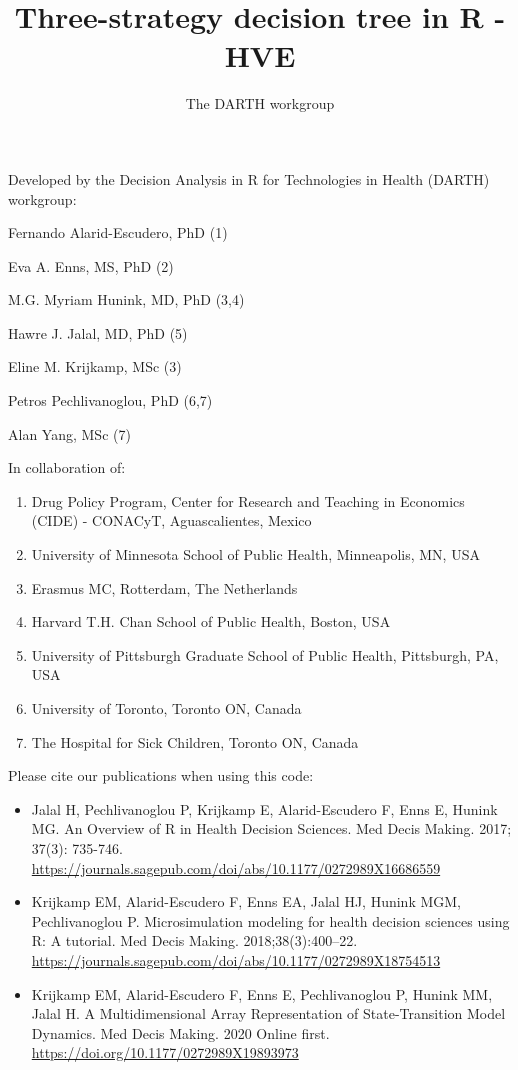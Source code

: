 \documentclass[
]{article}
\title{Three-strategy decision tree in R - HVE}
\author{The DARTH workgroup}
\date{}
\providecommand{\tightlist}{%
  \setlength{\itemsep}{0pt}\setlength{\parskip}{0pt}}
\begin{document}
\maketitle

Developed by the Decision Analysis in R for Technologies in Health
(DARTH) workgroup:

Fernando Alarid-Escudero, PhD (1)

Eva A. Enns, MS, PhD (2)

M.G. Myriam Hunink, MD, PhD (3,4)

Hawre J. Jalal, MD, PhD (5)

Eline M. Krijkamp, MSc (3)

Petros Pechlivanoglou, PhD (6,7)

Alan Yang, MSc (7)

In collaboration of:

\begin{enumerate}
\def\labelenumi{\arabic{enumi}.}
\tightlist
\item
  Drug Policy Program, Center for Research and Teaching in Economics
  (CIDE) - CONACyT, Aguascalientes, Mexico
\item
  University of Minnesota School of Public Health, Minneapolis, MN, USA
\item
  Erasmus MC, Rotterdam, The Netherlands
\item
  Harvard T.H. Chan School of Public Health, Boston, USA
\item
  University of Pittsburgh Graduate School of Public Health, Pittsburgh,
  PA, USA
\item
  University of Toronto, Toronto ON, Canada
\item
  The Hospital for Sick Children, Toronto ON, Canada
\end{enumerate}

Please cite our publications when using this code:

\begin{itemize}
\item
  Jalal H, Pechlivanoglou P, Krijkamp E, Alarid-Escudero F, Enns E,
  Hunink MG. An Overview of R in Health Decision Sciences. Med Decis
  Making. 2017; 37(3): 735-746.
  \url{https://journals.sagepub.com/doi/abs/10.1177/0272989X16686559}
\item
  Krijkamp EM, Alarid-Escudero F, Enns EA, Jalal HJ, Hunink MGM,
  Pechlivanoglou P. Microsimulation modeling for health decision
  sciences using R: A tutorial. Med Decis Making. 2018;38(3):400--22.
  \url{https://journals.sagepub.com/doi/abs/10.1177/0272989X18754513}
\item
  Krijkamp EM, Alarid-Escudero F, Enns E, Pechlivanoglou P, Hunink MM,
  Jalal H. A Multidimensional Array Representation of State-Transition
  Model Dynamics. Med Decis Making. 2020 Online first.
  \url{https://doi.org/10.1177/0272989X19893973}
\end{itemize}
\end{document}
